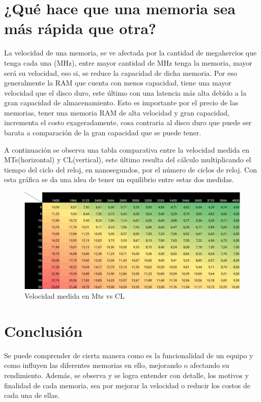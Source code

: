 \documentclass{article}
\begin{document}
\vspace{5mm}

\section{¿Qué hace que una memoria sea más rápida que otra?}
La velocidad de una memoria, se ve afectada por la cantidad de megahercios que tenga cada una (MHz), entre mayor cantidad de MHz tenga la memoria, mayor será su velocidad, eso si, se reduce la capacidad de dicha memoria. Por eso generalmente la RAM que cuenta con menos capacidad, tiene una mayor velocidad que el disco duro, este último con una latencia más alta debido a la gran capacidad de almacenamiento. Esto es importante por el precio de las memorias, tener una memoria RAM de alta velocidad y gran capacidad, incrementa el costo exageradamente, cosa contraria al disco duro que puede ser barata a comparación de la gran capacidad que se puede tener. \cite{velocidad} \break
\vspace{1mm}

A continuación se observa una tabla comparativa entre la velocidad medida en MTs(horizontal) y CL(vertical), este último resulta del cálculo multiplicando el tiempo del ciclo del reloj, en nanosegundos, por el número de ciclos de reloj. Con esta gráfica se da una idea de tener un equilibrio entre estas dos medidas.

\begin{figure}[h]
\includegraphics[width=12cm]{latencia.png}
\centering
\caption{Velocidad medida en Mts vs CL}
\end{figure}

\section{Conclusión} \label{conclulsion}
Se puede comprender de cierta manera como es la funcionalidad de un equipo y como influyen las diferentes memorias en ello, mejorando o afectando su rendimiento. Además, se observa y se logra entender con detalle, los motivos y finalidad de cada memoria, sea por mejorar la velocidad o reducir los costos de cada una de ellas.



\end{document}
